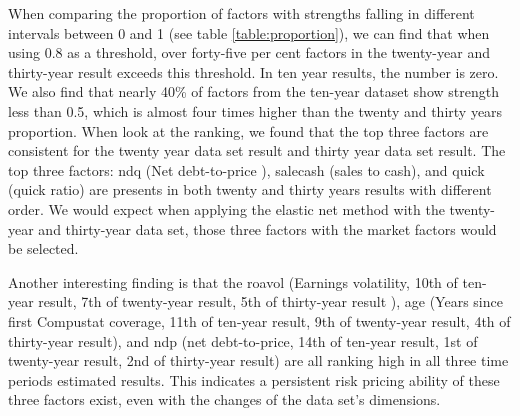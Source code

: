 When comparing the proportion of factors with strengths falling in different intervals between 0 and 1 (see table \ref{table:proportion}), we can find that when using 0.8 as a threshold, over forty-five per cent factors in the twenty-year and thirty-year result exceeds this threshold.
In ten year results, the number is zero.
We also find that nearly 40\% of factors from the ten-year dataset show strength less than 0.5, which is almost four times higher than the twenty and thirty years proportion.
When look at the ranking, we found that the top three factors are consistent for the twenty year data set result and thirty year data set result.
The top three factors: ndq (Net debt-to-price ), salecash (sales to cash), and quick (quick ratio) are presents in both twenty and thirty years results with different order.
We would expect when applying the elastic net method with the twenty-year and thirty-year data set, those three factors with the market factors would be selected.

Another interesting finding is that the roavol (Earnings volatility, 10th of ten-year result, 7th of twenty-year result, 5th of thirty-year result ), age (Years since first Compustat coverage, 11th of ten-year result, 9th of twenty-year result, 4th of thirty-year result), and ndp (net debt-to-price, 14th of ten-year result, 1st of twenty-year result, 2nd of thirty-year result) are all ranking high  in all three time periods estimated results.
This indicates a persistent risk pricing ability of these three factors exist, even with the changes of the data set's dimensions.

